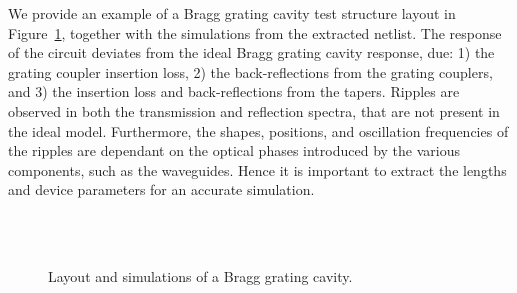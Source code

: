 \documentclass[journal]{spie}
\begin{document}
We provide an example of a Bragg grating cavity test structure layout in Figure~\ref{Bragg}, together with the simulations from the extracted netlist.  The response of the circuit deviates from the ideal Bragg grating cavity response, due: 1) the grating coupler insertion loss, 2) the back-reflections from the grating couplers, and 3) the insertion loss and back-reflections from the tapers.  Ripples are observed in both the transmission and reflection spectra, that are not present in the ideal model.  Furthermore, the shapes,  positions, and oscillation frequencies of the ripples are dependant on the optical phases introduced by the various components, such as the waveguides.  Hence it is important to extract the lengths and device parameters for an accurate simulation.

\begin{figure}[tbp]
\begin{center}   
 \\
 \\
\caption{Layout and simulations of a Bragg grating cavity.}
\label{Bragg}
\end{center}
\end{figure}
\end{document}
